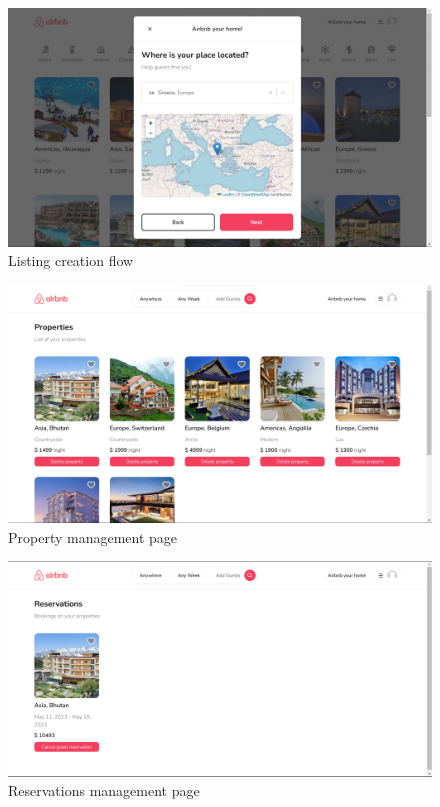 \begin{figure}[!h]
	\centering
	\includegraphics[scale=0.3]{chapters/images/listing-creation.png}
	\caption{Listing creation flow}
\end{figure}

\begin{figure}[!h]
	\centering
	\includegraphics[scale=0.3]{chapters/images/properties-page.png}
	\caption{Property management page}
\end{figure}

\begin{figure}[!h]
	\centering
	\includegraphics[scale=0.3]{chapters/images/reservation-management.png}
	\caption{Reservations management page}
\end{figure}

